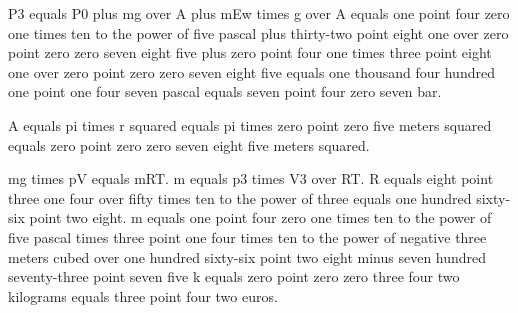 P3 equals P0 plus mg over A plus mEw times g over A equals one point four zero one times ten to the power of five pascal plus thirty-two point eight one over zero point zero zero seven eight five plus zero point four one times three point eight one over zero point zero zero seven eight five equals one thousand four hundred one point one four seven pascal equals seven point four zero seven bar.

A equals pi times r squared equals pi times zero point zero five meters squared equals zero point zero zero seven eight five meters squared.

mg times pV equals mRT. m equals p3 times V3 over RT. R equals eight point three one four over fifty times ten to the power of three equals one hundred sixty-six point two eight. m equals one point four zero one times ten to the power of five pascal times three point one four times ten to the power of negative three meters cubed over one hundred sixty-six point two eight minus seven hundred seventy-three point seven five k equals zero point zero zero three four two kilograms equals three point four two euros.